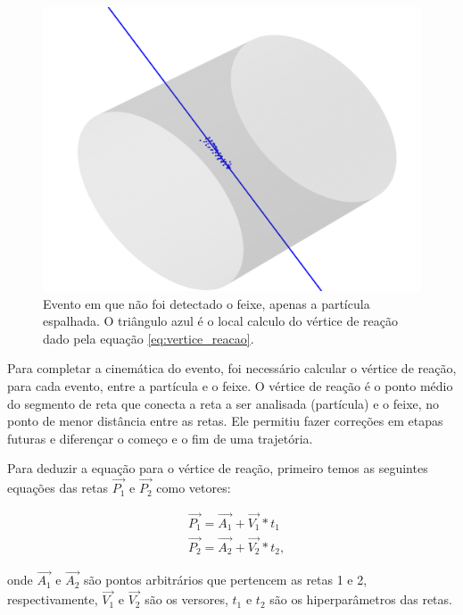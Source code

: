 \documentclass[a4paper,12pt,oneside]{book}
\begin{document}
\begin{figure}[H]
    \centering
    \includegraphics[scale = 0.65]{figs/Figure_12.png}
    \caption{Evento em que não foi detectado o feixe, apenas a partícula espalhada. O triângulo azul é o local calculo do vértice de reação dado pela equação \ref{eq:vertice_reacao}.}
    \label{fig:exemplo_sem_feixe}
\end{figure}

\par Para completar a cinemática do evento, foi necessário calcular o vértice de reação, para cada evento, entre a partícula e o feixe. O vértice de reação é o ponto médio do segmento de reta que conecta a reta a ser analisada (partícula) e o feixe, no ponto de menor distância entre as retas. Ele permitiu fazer correções em etapas futuras e diferençar o começo e o fim de uma trajetória.

\par Para deduzir a equação para o vértice de reação, primeiro temos as seguintes equações das retas $\vec{P_1}$ e $\vec{P_2}$ como vetores:

\begin{equation}
\begin{split}
        &\vec{P_1} = \vec{A_1} + \vec{V_1} * t_1 \\
        &\vec{P_2} = \vec{A_2} + \vec{V_2} * t_2,
\end{split}
\end{equation}

onde $\vec{A_1}$ e $\vec{A_2}$ são pontos arbitrários que pertencem as retas 1 e 2, respectivamente, $\vec{V_1}$ e $\vec{V_2}$ são os versores, $t_1$ e  $t_2$ são os hiperparâmetros das retas.
\end{document}
